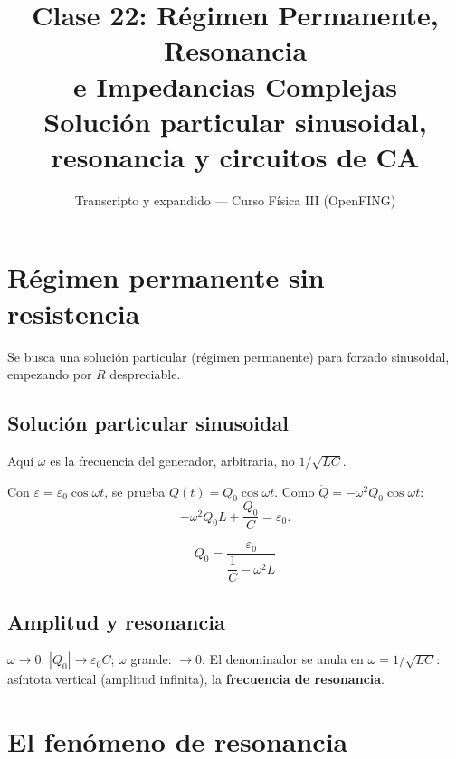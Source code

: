 \documentclass[12pt,a4paper]{article}
\title{\textbf{Clase 22: Régimen Permanente, Resonancia \\
        e Impedancias Complejas}\\[0.3em]
        \large{Solución particular sinusoidal, resonancia y circuitos de CA}}
\author{Transcripto y expandido --- Curso Física III (OpenFING)}
\date{}
\begin{document}
\maketitle
\thispagestyle{empty}
\newpage

\tableofcontents
\newpage

\section{Régimen permanente sin resistencia}

Se busca una solución particular (régimen permanente) para forzado sinusoidal,
empezando por $R$ despreciable.

\subsection{Solución particular sinusoidal}

\begin{warnbox}
  Aquí $\omega$ es la frecuencia del generador, arbitraria, no $1/\sqrt{LC}$.
\end{warnbox}

Con $\varepsilon = \varepsilon_0\cos\omega t$, se prueba $Q(t) = Q_0\cos\omega
t$. Como $\ddot Q = -\omega^2 Q_0\cos\omega t$:
\[
-\omega^2 Q_0 L + \frac{Q_0}{C} = \varepsilon_0.
\]

\begin{keybox}
  \[
  \boxed{Q_0 = \frac{\varepsilon_0}{\dfrac{1}{C} - \omega^2 L}}
  \]
\end{keybox}

\subsection{Amplitud y resonancia}

$\omega\to 0$: $|Q_0|\to\varepsilon_0 C$; $\omega$ grande: $\to 0$. El
denominador se anula en $\omega = 1/\sqrt{LC}$: asíntota vertical (amplitud
infinita), la \textbf{frecuencia de resonancia}.



\section{El fenómeno de resonancia}
\end{document}
